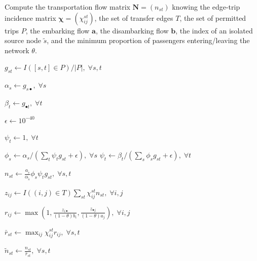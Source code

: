 \documentclass{bmcart}
\begin{document}
\begin{algorithm}[h]
	\caption{Compute the transportation flow matrix $\mathbf{N} = (n_{st})$ knowing the edge-trip incidence matrix $\bm{\chi} = (\chi_{ij}^{st})$, the set of transfer edges $T$, the set of permitted trips $P$, the embarking flow $\mathbf{a}$, the disambarking flow $\mathbf{b}$, the index of an isolated source node $\tilde{s}$, and the minimum proportion of passengers entering/leaving the network $\theta$.}
	\label{algo1}
	\begin{algorithmic}[1]
		\State $g_{st} \leftarrow I([s, t] \in P) / \vert P \vert, \; \forall s,t$ 
		
		\State $\alpha_s \leftarrow g_{s\bullet}, \; \forall s$ 
		
		\State $\beta_t \leftarrow g_{\bullet t}, \; \forall t$ 
		
		\State $\epsilon \leftarrow 10^{-40}$ 
		
		 
		
		\State $\psi_t \leftarrow 1, \; \forall t$
		
		 
		
		\State $\phi_s \leftarrow \alpha_s / (\sum_t \psi_t g_{st} + \epsilon), \; \forall s$
		\State $\psi_t \leftarrow \beta_t / (\sum_s \phi_s g_{st} + \epsilon), \; \forall t$
		
		\EndWhile
		
		\State $n_{st} \leftarrow \frac{a_{\tilde{s}}}{\alpha_{\tilde{s}}} \phi_s \psi_t g_{st}, \; \forall s,t$ 
		
		\State $z_{ij} \leftarrow I((i,j) \in T)\sum_{st} \chi_{ij}^{st} n_{st}, \; \forall i,j$
		
		\State $r_{ij} \leftarrow \max \left(1, \frac{z_{i \bullet}}{(1 - \theta)b_i}, \frac{z_{\bullet j}}{(1 - \theta)a_j} \right), \; \forall i,j$
		
		\State $\bar{r}_{st} \leftarrow \max_{ij} \chi_{ij}^{st} r_{ij}, \; \forall s,t$
		
		\State $\widetilde{n}_{st} \leftarrow \frac{n_{st}}{\bar{r}_{st}}, \; \forall s,t$
		

\end{algorithmic}
\end{algorithm}
\end{document}
